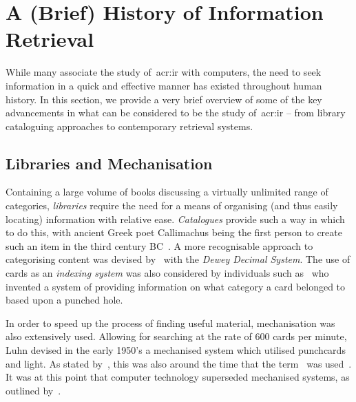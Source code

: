 \section{A (Brief) History of Information Retrieval}\label{sec:ir_background:history}
While many associate the study of~\gls{acr:ir} with computers, the need to seek information in a quick and effective manner has existed throughout human history. In this section, we provide a very brief overview of some of the key advancements in what can be considered to be the study of~\gls{acr:ir} -- from library cataloguing approaches to contemporary retrieval systems.


\subsection{Libraries and Mechanisation}
Containing a large volume of books discussing a virtually unlimited range of categories, \emph{libraries} require the need for a means of organising (and thus easily locating) information with relative ease. \emph{Catalogues} provide such a way in which to do this, with ancient Greek poet Callimachus being the first person to create such an item in the third century BC~\citep{eliot2009companion}. A more recognisable approach to categorising content was devised by~\cite{dewey1891dcs} with the \emph{Dewey Decimal System}. The use of cards as an \emph{indexing system} was also considered by individuals such as~\cite{soper1920patent} who invented a system of providing information on what category a card belonged to based upon a punched hole.

In order to speed up the process of finding useful material, mechanisation was also extensively used. Allowing for searching at the rate of $600$ cards per minute, Luhn devised in the early 1950's a mechanised system which utilised punchcards and light. As stated by~\cite{sanderson2012history_of_ir}, this was also around the time that the term~ was used~\citep{mooers1950theory}. It was at this point that computer technology superseded mechanised systems, as outlined by~\cite{jahoda1961electronic_searching}.

